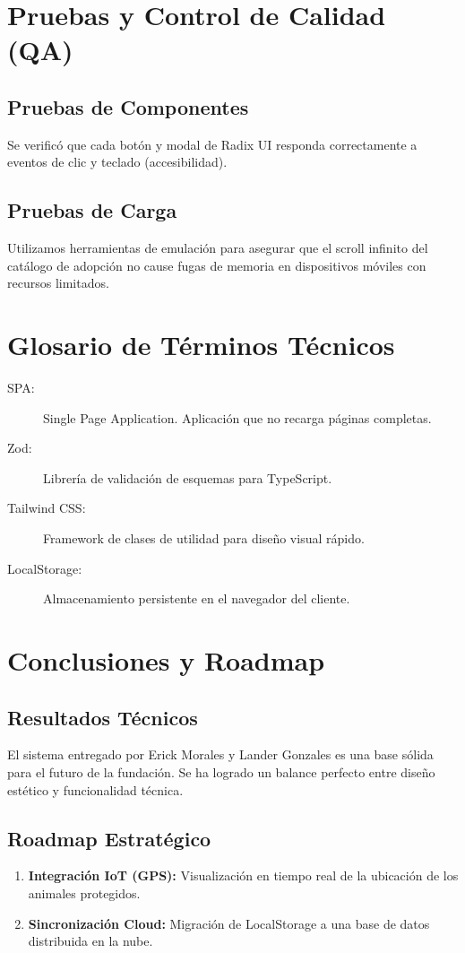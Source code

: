 \documentclass[12pt,a4paper,oneside]{report}
\begin{document}
\chapter{Pruebas y Control de Calidad (QA)}

\section{Pruebas de Componentes}
Se verificó que cada botón y modal de Radix UI responda correctamente a eventos de clic y teclado (accesibilidad).

\section{Pruebas de Carga}
Utilizamos herramientas de emulación para asegurar que el scroll infinito del catálogo de adopción no cause fugas de memoria en dispositivos móviles con recursos limitados.

\chapter{Glosario de Términos Técnicos}
\begin{description}
    \item[SPA:] Single Page Application. Aplicación que no recarga páginas completas.
    \item[Zod:] Librería de validación de esquemas para TypeScript.
    \item[Tailwind CSS:] Framework de clases de utilidad para diseño visual rápido.
    \item[LocalStorage:] Almacenamiento persistente en el navegador del cliente.
\end{description}

\chapter{Conclusiones y Roadmap}

\section{Resultados Técnicos}
El sistema entregado por Erick Morales y Lander Gonzales es una base sólida para el futuro de la fundación. Se ha logrado un balance perfecto entre diseño estético y funcionalidad técnica.

\section{Roadmap Estratégico}
\begin{enumerate}
    \item \textbf{Integración IoT (GPS):} Visualización en tiempo real de la ubicación de los animales protegidos.
    \item \textbf{Sincronización Cloud:} Migración de LocalStorage a una base de datos distribuida en la nube.
\end{enumerate}
\end{document}

